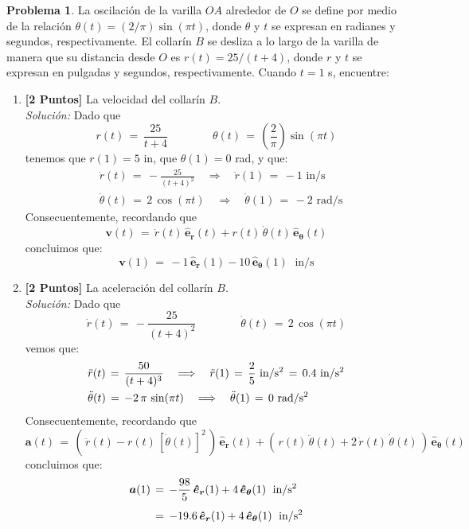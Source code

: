\documentclass[ a4paper, twoside, 11pt]{article}
\newcommand{\tsup}[1]{\ensuremath{^{\text{#1}}}}
\renewcommand{\vec}[1]{{\boldsymbol{#1}}}
\theoremstyle{definition}
\newtheorem{problem}[definition]{Problema}
\begin{document}
\begin{problem}
La oscilaci\'on de la varilla $OA$ alrededor de $O$ se define por medio de la relaci\'on $\theta(t) = (2/\pi) \sin ( \pi t )$, donde $\theta$ y $t$ se expresan en radianes y segundos, respectivamente. El collar\'in $B$ se desliza a lo largo de la varilla de manera que su distancia desde $O$ es $r(t) = 25 / ( t + 4 )$, donde $r$ y $t$ se expresan en pulgadas y segundos, respectivamente. Cuando $t = 1$ s, encuentre: 
\begin{enumerate}[label=\alph*.]
\item \textbf{[2 Puntos]} La velocidad del collar\'in $B$. \\[1ex] \emph{Soluci\'on:} Dado que 
\[
r(t) \, = \, \frac{25}{t+4} \qquad \qquad 
\theta(t) \, = \, \left( \frac{2}{\pi} \right) \sin( \pi t )
\]
tenemos que $r(1) = 5$ in, que $\theta(1) = 0$ rad, y que: 
\begin{align*}
& \dot{r}(t) \, = \, -\frac{25}{(t+4)^2} \quad \Longrightarrow \quad \dot{r}(1) \, = \, -1 \text{ in/s} \\
& \dot{\theta}(t) \, = \, 2 \, \cos( \pi t ) \quad \Longrightarrow \quad \dot{\theta}(1) \, = \, -2 \text{ rad/s}
\end{align*}
Consecuentemente, recordando que 
\[
\vec{v}(t) \, = \, \dot{r}(t) \, \vec{\hat{e}_r}(t) + r(t) \, \dot{\theta}(t) \, \vec{\hat{e}_{\theta}}(t)
\]
concluimos que: 
\[
\vec{v}(1) \, = \, -1 \, \vec{\hat{e}_r}(1) - 10 \, \vec{\hat{e}_{\theta}}(1) \; \text{ in/s}
\]

\item \textbf{[2 Puntos]} La aceleraci\'on del collar\'in $B$. \\[1ex] \emph{Soluci\'on:} Dado que 
\[
\dot{r}(t) \, = \, -\frac{25}{(t+4)^2} \qquad \qquad 
\dot{\theta}(t) \, = \, 2 \, \cos( \pi t )
\]
vemos que: 
\begin{align*}
& \ddot{r}(t) \, = \, \frac{50}{(t+4)^3} \quad \Longrightarrow \quad \ddot{r}(1) \, = \, \frac{2}{5} \text{ in/s\tsup{2}} \, = \, 0.4 \text{ in/s\tsup{2}} \\
& \ddot{\theta}(t) \, = \, -2 \, \pi \, \sin( \pi t ) \quad \Longrightarrow \quad \ddot{\theta}(1) \, = \, 0 \text{ rad/s\tsup{2}}
\end{align*}
Consecuentemente, recordando que 
\[
\vec{a}(t) \, = \, ( \, \ddot{r}(t) - r(t) \, [\dot{\theta}(t)]^2 \, ) \, \vec{\hat{e}_r}(t) + ( \, r(t) \, \ddot{\theta}(t) + 2 \, \dot{r}(t) \, \dot{\theta}(t) \, ) \, \vec{\hat{e}_{\theta}}(t)
\]
concluimos que: 
\begin{align*}
\vec{a}(1) \, 
& = \, -\frac{98}{5} \, \vec{\hat{e}_r}(1) + 4 \, \vec{\hat{e}_{\theta}}(1) \; \text{ in/s\tsup{2}} \\[1ex]
& = \, -19.6 \, \vec{\hat{e}_r}(1) + 4 \, \vec{\hat{e}_{\theta}}(1) \; \text{ in/s\tsup{2}}
\end{align*}


\end{enumerate}
\end{problem}
\end{document}
